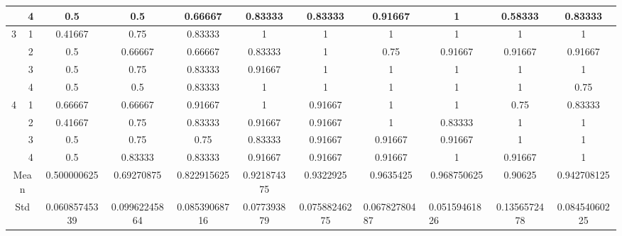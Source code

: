 \documentclass[draft,dvipsnames]{drexel-thesis}
\begin{document}
\begin{thesis}
\begin{table}[!t]
{\begin{tabular}{|c|c|c|c|c|c|c|c|c|c|c|}
                      & 4                   & 0.5           & 0.5           & 0.66667       & 0.83333     & 0.83333       & 0.91667                            & 1                                  & 0.58333      & 0.83333       \\ \hline
\multirow{4}{*}{3}    & 1                   & 0.41667       & 0.75          & 0.83333       & 1           & 1             & 1                                  & 1                                  & 1            & 1             \\ \cline{2-11} 
                      & 2                   & 0.5           & 0.66667       & 0.66667       & 0.83333     & 1             & 0.75                               & 0.91667                            & 0.91667      & 0.91667       \\ \cline{2-11} 
                      & 3                   & 0.5           & 0.75          & 0.83333       & 0.91667     & 1             & 1                                  & 1                                  & 1            & 1             \\ \cline{2-11} 
                      & 4                   & 0.5           & 0.5           & 0.83333       & 1           & 1             & 1                                  & 1                                  & 1            & 0.75          \\ \hline
\multirow{4}{*}{4}    & 1                   & 0.66667       & 0.66667       & 0.91667       & 1           & 0.91667       & 1                                  & 1                                  & 0.75         & 0.83333       \\ \cline{2-11} 
                      & 2                   & 0.41667       & 0.75          & 0.83333       & 0.91667     & 0.91667       & 1                                  & 0.83333                            & 1            & 1             \\ \cline{2-11} 
                      & 3                   & 0.5           & 0.75          & 0.75          & 0.83333     & 0.91667       & 0.91667                            & 0.91667                            & 1            & 1             \\ \cline{2-11} 
                      & 4                   & 0.5           & 0.83333       & 0.83333       & 0.91667     & 0.91667       & 0.91667                            & 1                                  & 0.91667      & 1             \\ \hline
\multicolumn{2}{|c|}{Mean}                  & 0.500000625   & 0.69270875    & 0.822915625   & 0.921874375 & 0.9322925     & 0.9635425                          & 0.968750625                        & 0.90625      & 0.942708125   \\ \hline
\multicolumn{2}{|c|}{Std}                   & 0.06085745339 & 0.09962245864 & 0.08539068716 & 0.077393879 & 0.07588246275 & \multicolumn{1}{l|}{0.06782780487} & \multicolumn{1}{l|}{0.05159461826} & 0.1356572478 & 0.08454060225 \\ \hline
\end{tabular}}
\end{table}


\end{thesis}
\end{document}
